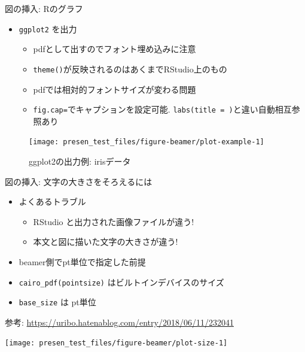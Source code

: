 \documentclass[
  12pt,
  ignorenonframetext,
]{beamer}
\providecommand{\tightlist}{%
  \setlength{\itemsep}{0pt}\setlength{\parskip}{0pt}}
\begin{document}
\begin{frame}[fragile]{図の挿入: Rのグラフ}
\protect\hypertarget{ux56f3ux306eux633fux5165-rux306eux30b0ux30e9ux30d5}{}

\begin{itemize}
\tightlist
\item
  \texttt{ggplot2} を出力

  \begin{itemize}
  \tightlist
  \item
    pdfとして出すのでフォント埋め込みに注意
  \item
    \texttt{theme()}が反映されるのはあくまでRStudio上のもの
  \item
    pdfでは相対的フォントサイズが変わる問題
  \item
    \texttt{fig.cap=}でキャプションを設定可能.
    \texttt{labs(title\ =\ )}と違い自動相互参照あり
  \end{itemize}
\end{itemize}

\begin{figure}

{\centering \texttt{[image: presen\_test\_files/figure-beamer/plot-example-1]} 

}

\caption{ggplot2の出力例: irisデータ}\label{fig:plot-example}
\end{figure}

\end{frame}

\begin{frame}[fragile]{図の挿入: 文字の大きさをそろえるには}
\protect\hypertarget{ux56f3ux306eux633fux5165-ux6587ux5b57ux306eux5927ux304dux3055ux3092ux305dux308dux3048ux308bux306bux306f}{}

\begin{itemize}
\tightlist
\item
  よくあるトラブル

  \begin{itemize}
  \tightlist
  \item
    RStudio と出力された画像ファイルが違う!
  \item
    本文と図に描いた文字の大きさが違う!
  \end{itemize}
\item
  beamer側でpt単位で指定した前提
\item
  \texttt{cairo\_pdf(pointsize)} はビルトインデバイスのサイズ
\item
  \texttt{base\_size} は pt単位
\end{itemize}

参考: \url{https://uribo.hatenablog.com/entry/2018/06/11/232041}

\begin{center}\texttt{[image: presen\_test\_files/figure-beamer/plot-size-1]} \end{center}

\end{frame}
\end{document}
